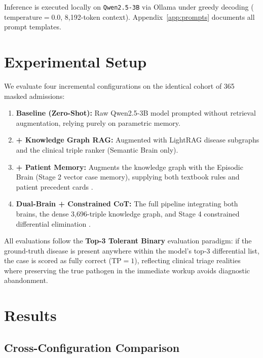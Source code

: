 \documentclass{article}
\begin{document}
Inference is executed locally on \texttt{Qwen2.5-3B} \citep{qwen2024} via Ollama under greedy decoding ($\text{temperature}=0.0$, 8,192-token context). Appendix~\ref{app:prompts} documents all prompt templates.

\section{Experimental Setup}

We evaluate four incremental configurations on the identical cohort of 365 masked admissions:

\begin{enumerate}[noitemsep]
    \item \textbf{Baseline (Zero-Shot):} Raw Qwen2.5-3B model prompted without retrieval augmentation, relying purely on parametric memory.
    \item \textbf{+ Knowledge Graph RAG:} Augmented with LightRAG disease subgraphs \citep{gao2023lightrag} and the clinical triple ranker (Semantic Brain only).
    \item \textbf{+ Patient Memory:} Augments the knowledge graph with the Episodic Brain (Stage 2 vector case memory), supplying both textbook rules and patient precedent cards \citep{wu2025medcasereasoning,xiong2024benchmarking}.
    \item \textbf{Dual-Brain + Constrained CoT:} The full pipeline integrating both brains, the dense 3,696-triple knowledge graph, and Stage 4 constrained differential elimination \citep{renze2024benefits}.
\end{enumerate}

All evaluations follow the \textbf{Top-3 Tolerant Binary} evaluation paradigm: if the ground-truth disease is present anywhere within the model's top-3 differential list, the case is scored as fully correct ($\text{TP}=1$), reflecting clinical triage realities where preserving the true pathogen in the immediate workup avoids diagnostic abandonment.

\section{Results}

\subsection{Cross-Configuration Comparison}
\end{document}
